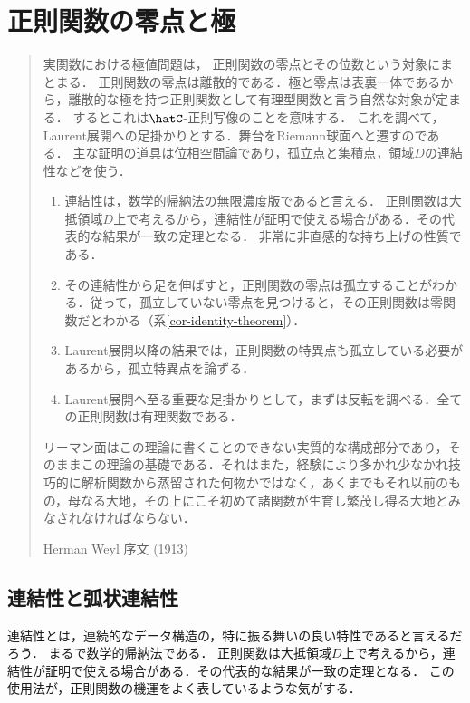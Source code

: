 \documentclass[uplatex, dvipdfmx]{jsreport}
\begin{document}
\chapter{正則関数の零点と極}

\begin{quotation}
    実関数における極値問題は，
    正則関数の零点とその位数という対象にまとまる．
    正則関数の零点は離散的である．極と零点は表裏一体であるから，離散的な極を持つ正則関数として有理型関数と言う自然な対象が定まる．
    するとこれは$\hatC$-正則写像のことを意味する．
    これを調べて，Laurent展開への足掛かりとする．舞台をRiemann球面へと遷すのである．
    主な証明の道具は位相空間論であり，孤立点と集積点，領域$D$の連結性などを使う．
    \begin{enumerate}
        \item 連結性は，数学的帰納法の無限濃度版であると言える．
        正則関数は大抵領域$D$上で考えるから，連結性が証明で使える場合がある．その代表的な結果が一致の定理となる．
        非常に非直感的な持ち上げの性質である．
        \item その連結性から足を伸ばすと，正則関数の零点は孤立することがわかる．従って，孤立していない零点を見つけると，その正則関数は零関数だとわかる（系\ref{cor-identity-theorem}）．
        \item Laurent展開以降の結果では，正則関数の特異点も孤立している必要があるから，孤立特異点を論ずる．
        \item Laurent展開へ至る重要な足掛かりとして，まずは反転を調べる．全ての正則関数は有理関数である．
    \end{enumerate}
    リーマン面はこの理論に書くことのできない実質的な構成部分であり，そのままこの理論の基礎である．それはまた，経験により多かれ少なかれ技巧的に解析関数から蒸留された何物かではなく，あくまでもそれ以前のもの，母なる大地，その上にこそ初めて諸関数が生育し繁茂し得る大地とみなされなければならない．
    \begin{flushright}
        Herman Weyl\cite{Weyl} 序文 (1913)
    \end{flushright}
\end{quotation}

\section{連結性と弧状連結性}

\begin{screen}
    連結性とは，連続的なデータ構造の，特に振る舞いの良い特性であると言えるだろう．
    まるで数学的帰納法である．
    正則関数は大抵領域$D$上で考えるから，連結性が証明で使える場合がある．その代表的な結果が一致の定理となる．
    この使用法が，正則関数の機運をよく表しているような気がする．
\end{screen}
\end{document}

